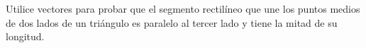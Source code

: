 \item Utilice vectores para probar que el segmento rectilíneo que une los puntos medios de dos lados de un triángulo es paralelo al tercer lado y tiene la mitad de su longitud.
